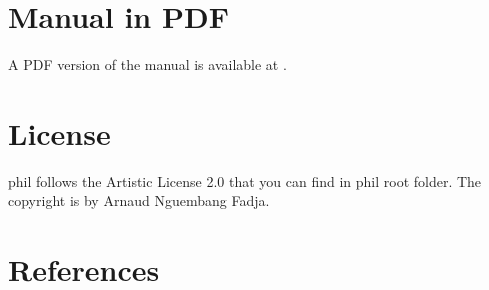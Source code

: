 \documentclass[letterpaper,10pt,english]{sphinxmanual}
\begin{document}
\chapter{Manual in PDF}
\label{\detokenize{index:manual-in-pdf}}
A PDF version of the manual is available at .


\chapter{License}
\label{\detokenize{index:license}}
phil follows the Artistic License 2.0 that you can find in phil root folder.
The copyright is by Arnaud Nguembang Fadja.


\chapter{References}
\label{\detokenize{index:references}}
\end{document}
